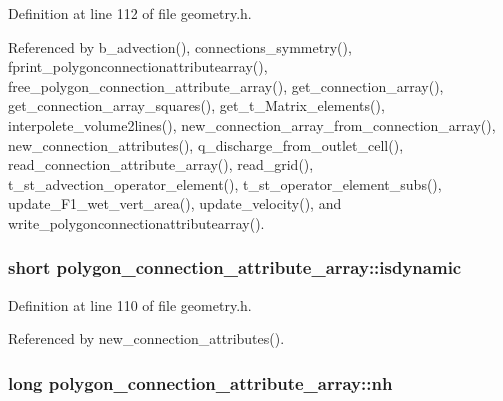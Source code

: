 Definition at line 112 of file geometry.\-h.



Referenced by b\-\_\-advection(), connections\-\_\-symmetry(), fprint\-\_\-polygonconnectionattributearray(), free\-\_\-polygon\-\_\-connection\-\_\-attribute\-\_\-array(), get\-\_\-connection\-\_\-array(), get\-\_\-connection\-\_\-array\-\_\-squares(), get\-\_\-t\-\_\-\-Matrix\-\_\-elements(), interpolete\-\_\-volume2lines(), new\-\_\-connection\-\_\-array\-\_\-from\-\_\-connection\-\_\-array(), new\-\_\-connection\-\_\-attributes(), q\-\_\-discharge\-\_\-from\-\_\-outlet\-\_\-cell(), read\-\_\-connection\-\_\-attribute\-\_\-array(), read\-\_\-grid(), t\-\_\-st\-\_\-advection\-\_\-operator\-\_\-element(), t\-\_\-st\-\_\-operator\-\_\-element\-\_\-subs(), update\-\_\-\-F1\-\_\-wet\-\_\-vert\-\_\-area(), update\-\_\-velocity(), and write\-\_\-polygonconnectionattributearray().

\hypertarget{structpolygon__connection__attribute__array_a388b4a162beb023bbf07666c1d0ef4a7}{
\subsubsection[{isdynamic}]{\setlength{\rightskip}{0pt plus 5cm}short polygon\-\_\-connection\-\_\-attribute\-\_\-array\-::isdynamic}}\label{structpolygon__connection__attribute__array_a388b4a162beb023bbf07666c1d0ef4a7}


Definition at line 110 of file geometry.\-h.



Referenced by new\-\_\-connection\-\_\-attributes().

\hypertarget{structpolygon__connection__attribute__array_afc94c84e7a1941584da24c59dabcaedc}{
\subsubsection[{nh}]{\setlength{\rightskip}{0pt plus 5cm}long polygon\-\_\-connection\-\_\-attribute\-\_\-array\-::nh}}\label{structpolygon__connection__attribute__array_afc94c84e7a1941584da24c59dabcaedc}


